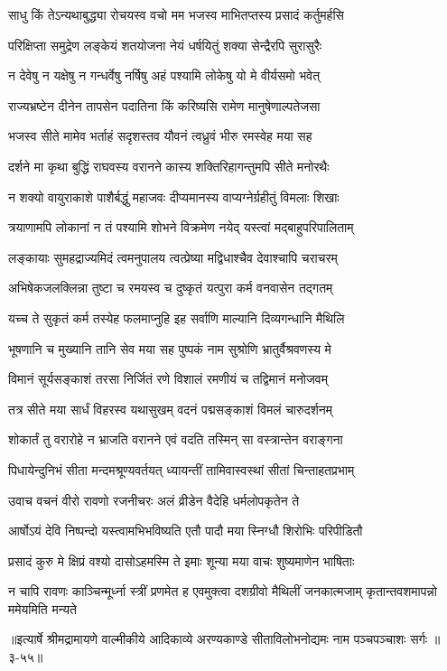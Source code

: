 \twolineshloka
{साधु किं तेऽन्यथाबुद्ध्या रोचयस्व वचो मम}
{भजस्व माभितप्तस्य प्रसादं कर्तुमर्हसि} %

\twolineshloka
{परिक्षिप्ता समुद्रेण लङ्केयं शतयोजना}
{नेयं धर्षयितुं शक्या सेन्द्रैरपि सुरासुरैः} %

\twolineshloka
{न देवेषु न यक्षेषु न गन्धर्वेषु नर्षिषु}
{अहं पश्यामि लोकेषु यो मे वीर्यसमो भवेत्} %

\twolineshloka
{राज्यभ्रष्टेन दीनेन तापसेन पदातिना}
{किं करिष्यसि रामेण मानुषेणाल्पतेजसा} %

\twolineshloka
{भजस्व सीते मामेव भर्ताहं सदृशस्तव}
{यौवनं त्वध्रुवं भीरु रमस्वेह मया सह} %

\twolineshloka
{दर्शने मा कृथा बुद्धिं राघवस्य वरानने}
{कास्य शक्तिरिहागन्तुमपि सीते मनोरथैः} %

\twolineshloka
{न शक्यो वायुराकाशे पाशैर्बद्धुं महाजवः}
{दीप्यमानस्य वाप्यग्नेर्ग्रहीतुं विमलाः शिखाः} %

\twolineshloka
{त्रयाणामपि लोकानां न तं पश्यामि शोभने}
{विक्रमेण नयेद् यस्त्वां मद्बाहुपरिपालिताम्} %

\twolineshloka
{लङ्कायाः सुमहद्राज्यमिदं त्वमनुपालय}
{त्वत्प्रेष्या मद्विधाश्चैव देवाश्चापि चराचरम्} %

\twolineshloka
{अभिषेकजलक्लिन्ना तुष्टा च रमयस्व च}
{दुष्कृतं यत्पुरा कर्म वनवासेन तद्गतम्} %

\twolineshloka
{यच्च ते सुकृतं कर्म तस्येह फलमाप्नुहि}
{इह सर्वाणि माल्यानि दिव्यगन्धानि मैथिलि} %

\twolineshloka
{भूषणानि च मुख्यानि तानि सेव मया सह}
{पुष्पकं नाम सुश्रोणि भ्रातुर्वैश्रवणस्य मे} %

\twolineshloka
{विमानं सूर्यसङ्काशं तरसा निर्जितं रणे}
{विशालं रमणीयं च तद्विमानं मनोजवम्} %

\twolineshloka
{तत्र सीते मया सार्धं विहरस्व यथासुखम्}
{वदनं पद्मसङ्काशं विमलं चारुदर्शनम्} %

\twolineshloka
{शोकार्तं तु वरारोहे न भ्राजति वरानने}
{एवं वदति तस्मिन् सा वस्त्रान्तेन वराङ्गना} %

\twolineshloka
{पिधायेन्दुनिभं सीता मन्दमश्रूण्यवर्तयत्}
{ध्यायन्तीं तामिवास्वस्थां सीतां चिन्ताहतप्रभाम्} %

\twolineshloka
{उवाच वचनं वीरो रावणो रजनीचरः}
{अलं व्रीडेन वैदेहि धर्मलोपकृतेन ते} %

\twolineshloka
{आर्षोऽयं देवि निष्पन्दो यस्त्वामभिभविष्यति}
{एतौ पादौ मया स्निग्धौ शिरोभिः परिपीडितौ} %

\twolineshloka
{प्रसादं कुरु मे क्षिप्रं वश्यो दासोऽहमस्मि ते}
{इमाः शून्या मया वाचः शुष्यमाणेन भाषिताः} %

\threelineshloka
{न चापि रावणः काञ्चिन्मूर्ध्ना स्त्रीं प्रणमेत ह}
{एवमुक्त्वा दशग्रीवो मैथिलीं जनकात्मजाम्}
{कृतान्तवशमापन्नो ममेयमिति मन्यते} %


॥इत्यार्षे श्रीमद्रामायणे वाल्मीकीये आदिकाव्ये अरण्यकाण्डे सीताविलोभनोद्यमः नाम पञ्चपञ्चाशः सर्गः ॥३-५५॥

